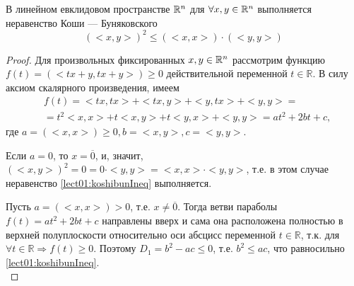 \begin{theorem}
	В линейном евклидовом пространстве $\mathbb{R}^n$ для $\forall x, y \in \mathbb{R}^n$ выполняется неравенство Коши — Буняковского
	\begin{equation}
	\label{lect01:koshibunIneq}
	\boxed{
		\left(<x, y>\right)^2 \leqslant (<x, x>) \cdot (<y, y>)}
	\end{equation}
\end{theorem}
\begin{proof}
	Для произвольных фиксированных $x, y \in \mathbb{R}^n$ рассмотрим функцию \\
	$f(t) = (<tx + y, tx + y>) \geqslant 0$ действительной переменной $t \in \mathbb{R}$. В силу аксиом скалярного произведения, имеем 
	\begin{equation*}
	\begin{split}
	& f(t) = < tx, tx > + <tx, y> + <y, tx> + <y, y> = \\
	&= t^2 <x, x> + t<x, y> + t<y, x> + <y, y> = a t^2  + 2bt + c,
	\end{split}
	\end{equation*}
	где $a = \left(<x,x>\right) \geqslant 0, b = <x,y>, c = <y,y>$.
	
	Если $a = 0$, то $x = \overline{0}$, и, значит, $\left(<x,y>\right)^2 =  0 = 0 \cdot <y, y> = <x, x> \cdot <y,y>$, т.е. в этом случае неравенство  \eqref{lect01:koshibunIneq} выполняется.
	
	Пусть $a = (<x, x>) > 0$, т.е. $x \ne \overline{0}$. Тогда ветви параболы $f(t) = a t^2 + 2bt + c$ направлены вверх и сама она расположена полностью в верхней полуплоскости относительно оси абсцисс переменной $t \in \mathbb{R}$, т.к. для $\forall t \in \mathbb{R} \Rightarrow f(t) \geqslant 0$. Поэтому $D_1 = b^2 - ac \leqslant 0$, т.е. $b^2 \leqslant ac$, что равносильно \eqref{lect01:koshibunIneq}.\\
\end{proof}

